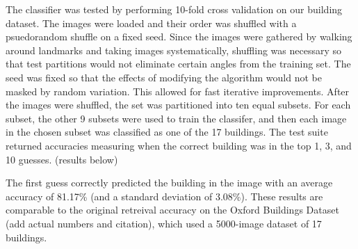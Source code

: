 The classifier was tested by performing 10-fold cross validation on our building dataset. The images were loaded and their order was shuffled with a psuedorandom shuffle on a fixed seed. Since the images were gathered by walking around landmarks and taking images systematically, shuffling was necessary so that test partitions would not eliminate certain angles from the training set. The seed was fixed so that the effects of modifying the algorithm would not be masked by random variation. This allowed for fast iterative improvements. After the images were shuffled, the set was partitioned into ten equal subsets. For each subset, the other 9 subsets were used to train the classifer, and then  each image in the chosen subset was classified as one of the 17 buildings. The test suite returned accuracies measuring when the correct building was in the top 1, 3, and 10 guesses. (results below)

The first guess correctly predicted the building in the image with an average accuracy of 81.17\% (and a standard deviation of 3.08\%). These results are comparable to the original retreival accuracy on the Oxford Buildings Dataset (add actual numbers and citation), which used a 5000-image dataset of 17 buildings.